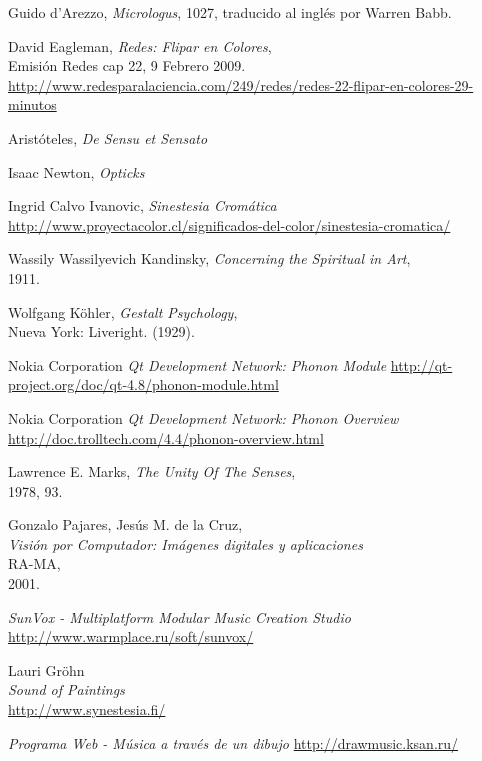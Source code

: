 \begin{thebibliography}{9}
 Guido d'Arezzo,
 \emph{Micrologus},
 1027,
 traducido al inglés por Warren Babb.

 David Eagleman,
 \emph{Redes: Flipar en Colores},\\
 Emisión Redes cap 22, 9 Febrero 2009.\\
 \url{http://www.redesparalaciencia.com/249/redes/redes-22-flipar-en-colores-29-minutos}

 Aristóteles,
 \emph{De Sensu et Sensato}

 Isaac Newton,
 \emph{Opticks}

 Ingrid Calvo Ivanovic,
 \emph{Sinestesia Cromática}
 \url{http://www.proyectacolor.cl/significados-del-color/sinestesia-cromatica/}

 Wassily Wassilyevich Kandinsky,
 \emph{Concerning the Spiritual in Art},\\
 1911.

 Wolfgang Köhler,
 \emph{Gestalt Psychology},\\
 Nueva York: Liveright. (1929).

 Nokia Corporation
 \emph{Qt Development Network: Phonon Module}
 \url{http://qt-project.org/doc/qt-4.8/phonon-module.html}
 
 Nokia Corporation
 \emph{Qt Development Network: Phonon Overview}
 \url{http://doc.trolltech.com/4.4/phonon-overview.html}

 Lawrence E. Marks,
 \emph{The Unity Of The Senses},\\
 1978, 93.

 Gonzalo Pajares, Jesús M. de la Cruz,\\
 \emph{Visión por Computador: Imágenes digitales y aplicaciones}\\
 RA-MA,\\
 2001.

\emph{SunVox - Multiplatform Modular Music Creation Studio}\\
\url{http://www.warmplace.ru/soft/sunvox/}

Lauri Gröhn\\
\emph{Sound of Paintings}\\
\url{http://www.synestesia.fi/}

\emph{Programa Web - Música a través de un dibujo}
\url{http://drawmusic.ksan.ru/}
\end{thebibliography}